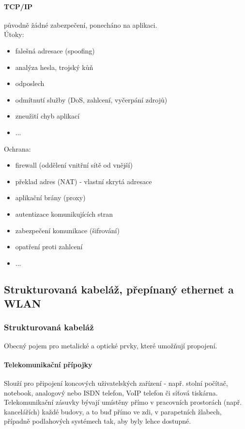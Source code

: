 \documentclass[10pt,a4paper]{article}
\begin{document}
\paragraph{TCP/IP} původně žádné zabezpečení, ponecháno na aplikaci. \\
Útoky:
\begin{itemize}
	\item falešná adresace (spoofing)
	\item analýza hesla, trojský kůň
	\item odposlech
	\item odmítnutí služby (DoS, zahlcení, vyčerpání zdrojů)
	\item zneužití chyb aplikací
	\item ...
\end{itemize}
Ochrana:
\begin{itemize}
	\item firewall (oddělení vnitřní sítě od vnější)
	\item překlad adres (NAT) - vlastní skrytá adresace
	\item aplikační brány (proxy)
	\item autentizace komunikujících stran
	\item zabezpečení komunikace (šifrování)
	\item opatření proti zahlcení
	\item ...
\end{itemize}




\subsection{Strukturovaná kabeláž, přepínaný ethernet a WLAN}
\subsubsection{Strukturovaná kabeláž}
Obecný pojem pro metalické a optické prvky, které umožňují propojení.
\paragraph{Telekomunikační přípojky} Slouží pro připojení koncových uživatelských zařízení - např. stolní počítač, notebook, analogový nebo ISDN telefon, VoIP telefon či síťová tiskárna. Telekomunikační zásuvky bývají umístěny přímo v pracovních prostorách (např. kancelářích) každé budovy, a to buď přímo ve zdi, v parapetních žlabech, případně podlahových systémech tak, aby byly lehce dostupné.
\end{document}
